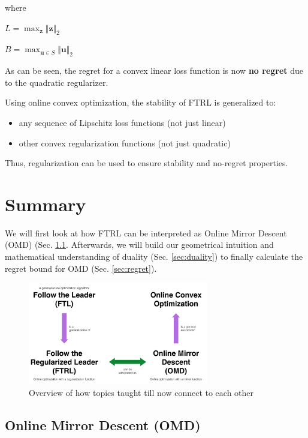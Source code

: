\documentclass[11pt]{article}
\begin{document}
where

\centerline{$L = \max_{\textbf{z}} \Vert \textbf{z} \Vert_2$}

\centerline{$B = \max_{\textbf{u} \in S} \Vert \textbf{u} \Vert_2$}

As can be seen, the regret for a convex linear loss function is now \textbf{no regret} due to the quadratic regularizer.

Using online convex optimization, the stability of FTRL is generalized to:

\begin{itemize}
    \item any sequence of Lipschitz loss functions (not just linear)
    \item other convex regularization functions (not just quadratic)
\end{itemize}

Thus, regularization can be used to ensure stability and no-regret properties.

\section{Summary}
We will first look at how FTRL can be interpreted as Online Mirror Descent (OMD) (Sec. \ref{sec:omd}. Afterwards, we will build our geometrical intuition and mathematical understanding of duality (Sec. \ref{sec:duality}) to finally calculate the regret bound for OMD (Sec. \ref{sec:regret}).

\begin{figure}[H]
    \centering
    \includegraphics[width=0.7\textwidth]{figs/chart.png}
    \caption{Overview of how topics taught till now connect to each other}
    \label{fig:chart}
\end{figure}

\subsection{Online Mirror Descent (OMD)}
\label{sec:omd}
\end{document}
